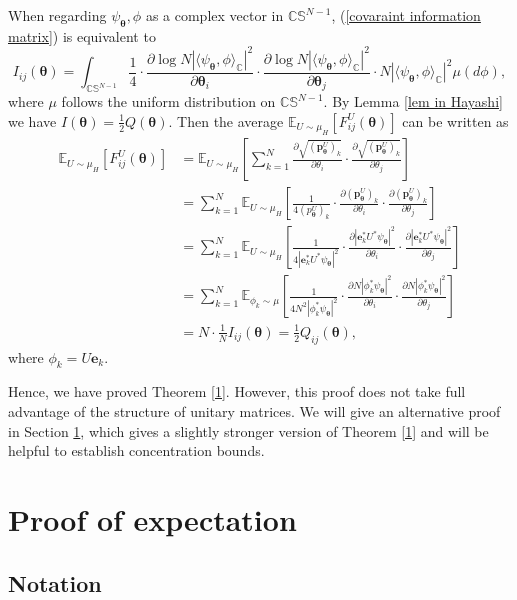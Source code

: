 \documentclass{amsart}
\theoremstyle{plain}
\theoremstyle{definition}
\theoremstyle{remark}
\newcommand{\CC}{\mathbb{C}}
\newcommand{\EE}{\mathbb{E}}
\begin{document}
When regarding $\psi_{\bm\theta},\phi$ as a complex vector in $\CC\mathbb S^{N-1}$,  (\ref{covaraint information matrix}) is equivalent to
\[  I_{ij}(\bm\theta)=\int_{\mathbb C\mathbb S^{N-1}}\frac{1}{4}\cdot \frac{\partial\log N|\langle\psi_{\bm\theta},\phi\rangle_{\CC}|^2}{\partial \bm\theta_i}\cdot \frac{\partial\log N|\langle\psi_{\bm\theta},\phi\rangle_{\CC}|^2}{\partial \bm\theta_j}\cdot N|\langle\psi_{\bm\theta},\phi\rangle_{\CC}|^2\mu (d\phi), \]
where $\mu$ follows the uniform distribution on $\CC\mathbb S^{N-1}$.
By Lemma \ref{lem in Hayashi} we have $I(\bm\theta)=\frac{1}{2}Q(\bm\theta)$. Then
 the average $\EE_{U\sim\mu_H}[F_{ij}^U(\bm\theta)]$ can be written as 
\begin{align*}
    \EE_{U\sim\mu_H}[F_{ij}^U(\bm\theta)]&=\EE_{U\sim\mu_H}\left[\sum\limits_{k=1}^N\frac{\partial \sqrt{(\bm{p}^U_{\bm\theta})_k}}{\partial\theta_i}\cdot \frac{\partial \sqrt{(\bm{p}^U_{\bm\theta})_k}}{\partial\theta_j}\right]\\
    &=\sum\limits_{k=1}^N\EE_{U\sim\mu_H}\left[\frac{1}{4(p_{\bm\theta}^U)_k}\cdot \frac{\partial {(\bm{p}^U_{\bm\theta})_k}}{\partial\theta_i}\cdot \frac{\partial {(\bm{p}^U_{\bm\theta})_k}}{\partial\theta_j}\right]\\
    &=\sum\limits_{k=1}^N\EE_{U\sim\mu_H}\left[\frac{1}{4|\bm e_k^* U^*\psi_{\bm\theta}|^2}\cdot \frac{\partial {|\bm e_k^* U^*\psi_{\bm\theta}|^2}}{\partial\theta_i}\cdot \frac{\partial {|\bm e_k^* U^*\psi_{\bm\theta}|^2}}{\partial\theta_j}\right]\\
    &=\sum\limits_{k=1}^N\EE_{\phi_k\sim\mu}\left[\frac{1}{4N^2| \phi_k^*\psi_{\bm\theta}|^2}\cdot \frac{\partial {N|\phi_k^*\psi_{\bm\theta}|^2}}{\partial\theta_i}\cdot \frac{\partial {N|  \phi_k^*\psi_{\bm\theta}|^2}}{\partial\theta_j}\right]\\
    &=N\cdot\frac{1}{N} I_{ij}(\bm\theta)=\frac{1}{2}Q_{ij}(\bm\theta),
\end{align*}
where $\phi_k=U\bm e_k$.

Hence, we have proved Theorem \ref{1}. 
However, this proof does not take full advantage of the structure of unitary matrices. We will give an alternative proof in Section \ref{sec:mean}, which gives a slightly stronger version of Theorem \ref{1} and will be helpful to establish concentration bounds. 
\section{Proof of expectation}\label{sec:mean}
\subsection{Notation}
\end{document}
